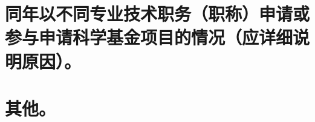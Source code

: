 \documentclass[UTF8, punct, oneside,fontset=none]{ctexbook}
\begin{document}
\begin{MS}
	
\end{MS}

\section{同年以不同专业技术职务\kg{0.3em}（职称）\kg{0.3em}申请或参与申请科学基金项目的情况（应详细说明原因）。}

\begin{MS}
	
\end{MS}

\section{其他。}

\begin{MS}
	
\end{MS}



\end{document}
